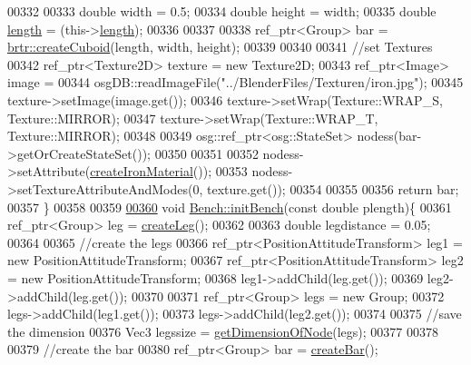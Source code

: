 \begin{DoxyCode}
00332 
00333         \textcolor{keywordtype}{double} width = 0.5;
00334         \textcolor{keywordtype}{double} height = width;
00335         \textcolor{keywordtype}{double} \hyperlink{classbrtr_1_1_bench_a81188a60871201d741c288396430964d}{length} = (this->\hyperlink{classbrtr_1_1_bench_a81188a60871201d741c288396430964d}{length});
00336 
00337 
00338         ref\_ptr<Group> bar = \hyperlink{namespacebrtr_ae7f155c263aec9663a02763ed0bb882b}{brtr::createCuboid}(length, width, height);
00339 
00340 
00341         \textcolor{comment}{//set Textures}
00342         ref\_ptr<Texture2D> texture = \textcolor{keyword}{new} Texture2D;
00343         ref\_ptr<Image> image =
00344             osgDB::readImageFile(\textcolor{stringliteral}{"../BlenderFiles/Texturen/iron.jpg"});
00345         texture->setImage(image.get());
00346         texture->setWrap(Texture::WRAP\_S, Texture::MIRROR);
00347         texture->setWrap(Texture::WRAP\_T, Texture::MIRROR);
00348 
00349         osg::ref\_ptr<osg::StateSet> nodess(bar->getOrCreateStateSet());
00350 
00351 
00352         nodess->setAttribute(\hyperlink{classbrtr_1_1_bench_aafa199aa2218d57b290d99843a1443d4}{createIronMaterial}());
00353         nodess->setTextureAttributeAndModes(0, texture.get());
00354 
00355 
00356         \textcolor{keywordflow}{return} bar;
00357     \}
00358 
00359 
\hypertarget{_bench_8cpp_source_l00360}{}\hyperlink{classbrtr_1_1_bench_a2813d4878b8a5ef09219323b2f6c9cf5}{00360}     \textcolor{keywordtype}{void} \hyperlink{classbrtr_1_1_bench_a2813d4878b8a5ef09219323b2f6c9cf5}{Bench::initBench}(\textcolor{keyword}{const} \textcolor{keywordtype}{double} plength)\{
00361         ref\_ptr<Group> leg = \hyperlink{classbrtr_1_1_bench_aefe5a9043a63e13d83c31a42046c6912}{createLeg}();
00362 
00363         \textcolor{keywordtype}{double} legdistance = 0.05;
00364 
00365         \textcolor{comment}{//create the legs}
00366         ref\_ptr<PositionAttitudeTransform> leg1 = \textcolor{keyword}{new} PositionAttitudeTransform;
00367         ref\_ptr<PositionAttitudeTransform> leg2 = \textcolor{keyword}{new} PositionAttitudeTransform;
00368         leg1->addChild(leg.get());
00369         leg2->addChild(leg.get());
00370 
00371         ref\_ptr<Group> legs = \textcolor{keyword}{new} Group;
00372         legs->addChild(leg1.get());
00373         legs->addChild(leg2.get());
00374 
00375         \textcolor{comment}{//save the dimension}
00376         Vec3 legssize = \hyperlink{namespacebrtr_a24ba7c5d07ad50afb09990116dd3556d}{getDimensionOfNode}(legs);
00377 
00378 
00379         \textcolor{comment}{//create the bar}
00380         ref\_ptr<Group> bar = \hyperlink{classbrtr_1_1_bench_ae17e8e692f6c6deb7b722b5df58dc04b}{createBar}();

\end{DoxyCode}
